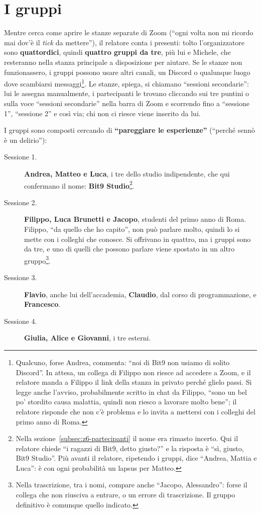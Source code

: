 \section{I gruppi}
\label{z7:sec:gruppi}

Mentre cerca come aprire le stanze separate di Zoom (``ogni volta non mi ricordo
mai dov'è il \emph{tick} da mettere''), il relatore conta i presenti: tolto
l'organizzatore sono \textbf{quattordici}, quindi \textbf{quattro gruppi da tre},
più lui e Michele, che resteranno nella stanza principale a disposizione per
aiutare. Se le stanze non funzionassero, i gruppi possono usare altri canali, un
Discord o qualunque luogo dove scambiarsi messaggi\footnote{Qualcuno, forse
Andrea, commenta: ``noi di Bit9 non usiamo di solito Discord''. In attesa, un
collega di Filippo non riesce ad accedere a Zoom, e il relatore manda a Filippo
il link della stanza in privato perché glielo passi. Si legge anche
l'avviso, probabilmente scritto in chat da Filippo, ``sono un bel po' stordito
causa malattia, quindi non riesco a lavorare molto bene''; il relatore risponde
che non c'è problema e lo invita a mettersi con i colleghi del primo anno di
Roma.}. Le stanze, spiega, si chiamano ``sessioni secondarie'': lui le assegna
manualmente, i partecipanti le trovano cliccando sui tre puntini o sulla voce
``sessioni secondarie'' nella barra di Zoom e scorrendo fino a ``sessione 1'',
``sessione 2'' e così via; chi non ci riesce viene inserito da lui.

I gruppi sono composti cercando di \textbf{``pareggiare le esperienze''}
(``perché sennò è un delirio''):
\begin{description}
  \item[Sessione 1.] \textbf{Andrea, Matteo e Luca}, i tre dello studio
        indipendente, che qui confermano il nome: \textbf{Bit9
        Studio}\footnote{Nella sezione~\ref{subsec:z6-partecipanti} il nome era
        rimasto incerto. Qui il relatore chiede ``i ragazzi di Bit9, detto
        giusto?'' e la risposta è ``sì, giusto, Bit9 Studio''. Più avanti il
        relatore, ripetendo i gruppi, dice ``Andrea, Mattia e Luca'': è con ogni
        probabilità un lapsus per Matteo.}.
  \item[Sessione 2.] \textbf{Filippo, Luca Brunetti e Jacopo}, studenti del
        primo anno di Roma. Filippo, ``da quello che ho capito'', non può
        parlare molto, quindi lo si mette con i colleghi che conosce. Si
        offrivano in quattro, ma i gruppi sono da tre, e uno di quelli che
        possono parlare viene spostato in un altro gruppo\footnote{Nella
        trascrizione, tra i nomi, compare anche ``Jacopo, Alessandro'': forse
        il collega che non riusciva a entrare, o un errore di trascrizione. Il
        gruppo definitivo è comunque quello indicato.}.
  \item[Sessione 3.] \textbf{Flavio}, anche lui dell'accademia, \textbf{Claudio},
        dal corso di programmazione, e \textbf{Francesco}.
  \item[Sessione 4.] \textbf{Giulia, Alice e Giovanni}, i tre esterni.
\end{description}

